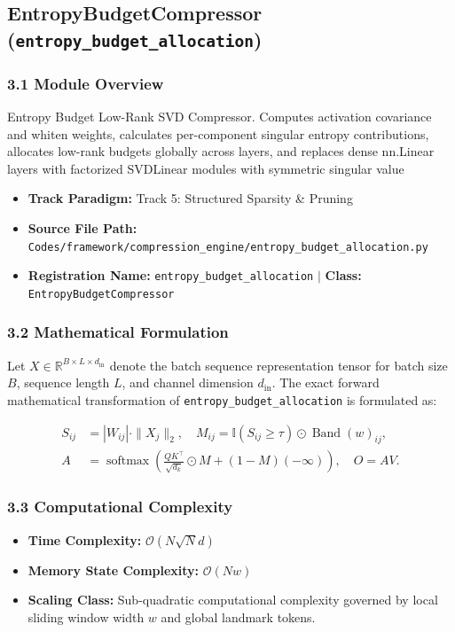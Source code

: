 \subsection{EntropyBudgetCompressor (\texttt{entropy\_budget\_allocation})}
\label{sec:app_module_entropy_budget_allocation}

\subsubsection*{3.1 Module Overview}
Entropy Budget Low-Rank SVD Compressor.  Computes activation covariance and whiten weights, calculates per-component singular entropy contributions, allocates low-rank budgets globally across layers, and replaces dense nn.Linear layers with factorized SVDLinear modules with symmetric singular value
\begin{itemize}
    \item \textbf{Track Paradigm:} Track 5: Structured Sparsity & Pruning
    \item \textbf{Source File Path:} \texttt{Codes/framework/compression\_engine/entropy\_budget\_allocation.py}
    \item \textbf{Registration Name:} \texttt{entropy\_budget\_allocation} $\mid$ \textbf{Class:} \texttt{EntropyBudgetCompressor}
\end{itemize}

\subsubsection*{3.2 Mathematical Formulation}
Let $X \in \mathbb{R}^{B \times L \times d_{\text{in}}}$ denote the batch sequence representation tensor for batch size $B$, sequence length $L$, and channel dimension $d_{\text{in}}$. The exact forward mathematical transformation of \texttt{entropy\_budget\_allocation} is formulated as:

\begin{align}
S_{ij} &= |W_{ij}| \cdot \|X_j\|_2, \quad M_{ij} = \mathbb{I}(S_{ij} \ge \tau) \odot \operatorname{Band}(w)_{ij}, \\
A &= \operatorname{softmax}\left(\frac{Q K^\top}{\sqrt{d_k}} \odot M + (1 - M)(-\infty)\right), \quad O = A V.
\end{align}


\subsubsection*{3.3 Computational Complexity}
\begin{itemize}
    \item \textbf{Time Complexity:} $\mathcal{O}(N \sqrt{N} d)$
    \item \textbf{Memory State Complexity:} $\mathcal{O}(N w)$
    \item \textbf{Scaling Class:} Sub-quadratic computational complexity governed by local sliding window width $w$ and global landmark tokens.
\end{itemize}

